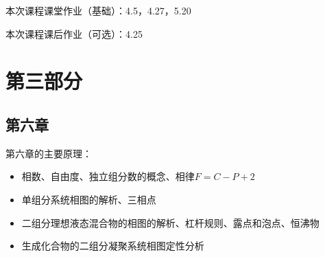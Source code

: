 \documentclass[9pt]{beamer}
\begin{document}
	\begin{frame}
	
	本次课程课堂作业（基础）：4.5，4.27，5.20
	
	\hspace*{\fill}	
	
	本次课程课后作业（可选）：4.25
	
	\end{frame}

	\section{第三部分}	
	
	\subsection{第六章}
	\begin{frame}
	
	第六章的主要原理：
	\begin{itemize}
	
	\item 相数、自由度、独立组分数的概念、相律$F=C-P+2$
	
	\item 单组分系统相图的解析、三相点
	
	\item 二组分理想液态混合物的相图的解析、杠杆规则、露点和泡点、恒沸物
	
	\item 生成化合物的二组分凝聚系统相图定性分析
	
	\end{itemize}
	
	\end{frame}
	
\end{document}

